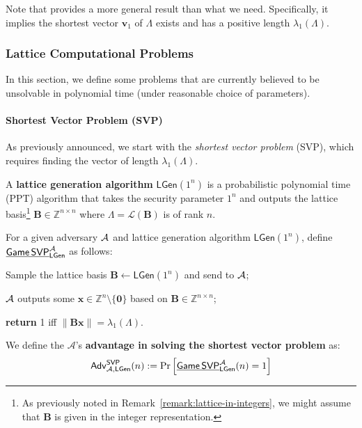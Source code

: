 \documentclass[../../book.tex]{subfiles}
\begin{document}
Note that  provides a more general result than what we need. 
Specifically, it implies the shortest vector $\mathbf{v}_1$ of $\Lambda$ exists and has a positive length $\lambda_1(\Lambda)$.

\subsubsection{Lattice Computational Problems}\label{section:lattice-problems}

In this section, we define some problems that are currently believed to be unsolvable in polynomial time (under reasonable choice of parameters). 

\paragraph{Shortest Vector Problem (SVP)}
As previously announced, we start with the \textit{shortest vector problem} (SVP), which requires finding the vector of length $\lambda_1(\Lambda)$.
\begin{definition}
    A \textbf{lattice generation algorithm} $\mathsf{LGen}(1^{n})$ is a probabilistic polynomial time (PPT) algorithm that takes the security parameter $1^{n}$ and outputs the lattice basis\footnote{As previously noted in Remark~\ref{remark:lattice-in-integers}, we might assume that $\mathbf{B}$ is given in the integer representation.} $\mathbf{B} \in \mathbb{Z}^{n \times n}$ where $\Lambda=\mathcal{L}(\mathbf{B})$ is of rank $n$.
\end{definition}

\begin{definition}\label{def:svp}
    For a given adversary $\mathcal{A}$ and lattice generation algorithm $\mathsf{LGen}(1^{n})$, define $\underline{\mathsf{Game}\,\mathsf{SVP}}^{\mathcal{A}}_{\mathsf{LGen}}$ as follows:
    \begin{algoen}
        \item Sample the lattice basis $\mathbf{B} \gets \mathsf{LGen}(1^{n})$ and send to $\mathcal{A}$;
        \item $\mathcal{A}$ outputs some $\mathbf{x} \in \mathbb{Z}^{n} \setminus \{\mathbf{0}\}$ based on $\mathbf{B} \in \mathbb{Z}^{n \times n}$;
        \item \textbf{return} 1 iff $\|\mathbf{B}\mathbf{x}\|=\lambda_1(\Lambda)$.
    \end{algoen}
    We define the $\mathcal{A}$'s \textbf{advantage in solving the shortest
    vector problem} as:
    \begin{equation*}
        \mathsf{Adv}^{\mathsf{SVP}}_{\mathcal{A},\mathsf{LGen}}(n) := \Pr\left[\underline{\mathsf{Game}\,\mathsf{SVP}}^{\mathcal{A}}_{\mathsf{LGen}}(n) = 1\right]
    \end{equation*} 
\end{definition}
\end{document}
